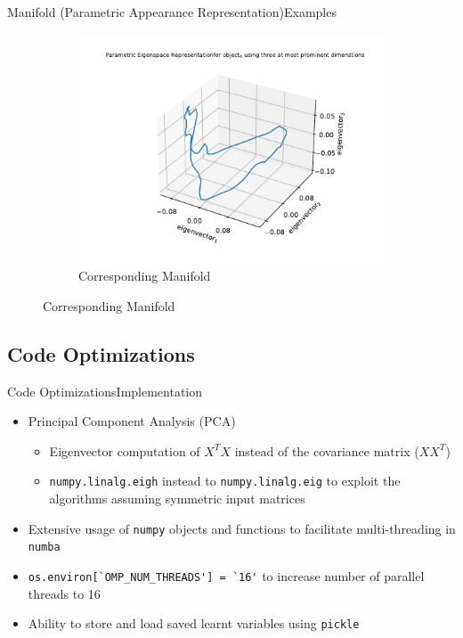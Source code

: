 \documentclass[aspectratio=169, handout, 10pt, hyperref=colorlinks]{beamer}
\begin{document}
\begin{frame}{Manifold (Parametric Appearance Representation)}{Examples}
\begin{figure}
\begin{subfigure}{0.32\linewidth}
            \centering
            \includegraphics[width = \linewidth]{splines/4.pdf}
            \caption{Corresponding Manifold}
        \end{subfigure}
    \end{figure}
\end{frame}
\subsection{Code Optimizations}
\begin{frame}[fragile]{Code Optimizations}{Implementation}
    \begin{itemize}
        \item Principal Component Analysis (PCA)
        \begin{itemize}
            \item Eigenvector computation of $X^TX$ instead of the covariance matrix ($XX^T$)
            \item \verb!numpy.linalg.eigh! instead to \verb!numpy.linalg.eig! to exploit the algorithms assuming symmetric input matrices
        \end{itemize}
        \item Extensive usage of \verb!numpy! objects and functions to facilitate multi-threading in \verb!numba!
        \item \verb!os.environ[`OMP_NUM_THREADS'] = `16'! to increase number of parallel threads to 16
        \item Ability to store and load saved learnt variables using \verb!pickle!
    \end{itemize}
\end{frame}
\end{document}
